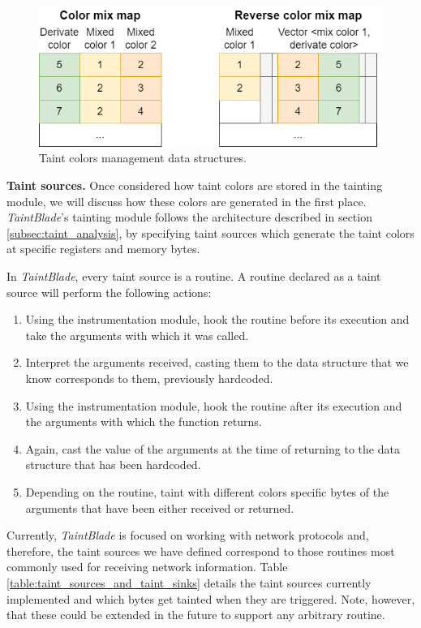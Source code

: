 \documentclass[conference]{IEEEtran}
\begin{document}
\begin{figure}
    \centerline{\includegraphics[width=0.9\columnwidth]{images/colormixtaintarch.drawio.png}}
    \caption{Taint colors management data structures.}
    \label{figure:colormixtaintarch}
\end{figure}

\textbf{Taint sources.} Once considered how taint colors are stored in the tainting
module, we will discuss how these colors are generated in the first place. \textit{TaintBlade}'s
tainting module follows the architecture described in section \ref{subsec:taint_analysis}, by specifying taint sources
which generate the taint colors at specific registers and memory bytes.

In \textit{TaintBlade}, every taint source is a routine. A routine declared as
a taint source will perform the following actions:
\begin{enumerate}
    \item Using the instrumentation module, hook the routine before its execution and
          take the arguments with which it was called.
    \item Interpret the arguments received, casting them to the data structure that we
          know corresponds to them, previously hardcoded.
    \item Using the instrumentation module, hook the routine after its execution and the
          arguments with which the function returns.
    \item Again, cast the value of the arguments at the time of returning to the data
          structure that has been hardcoded.
    \item Depending on the routine, taint with different colors specific bytes of the
          arguments that have been either received or returned.
\end{enumerate}

Currently, \textit{TaintBlade} is focused on working with network protocols
and, therefore, the taint sources we have defined correspond to those routines
most commonly used for receiving network information. Table
\ref{table:taint_sources_and_taint_sinks} details the taint sources currently
implemented and which bytes get tainted when they are triggered. Note, however,
that these could be extended in the future to support any arbitrary routine.
\end{document}
